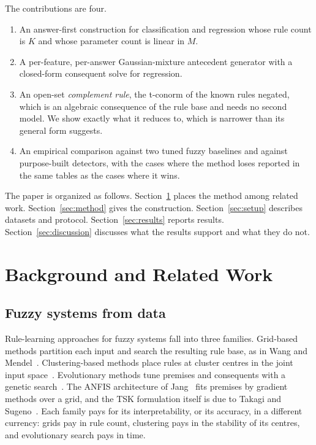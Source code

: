 \documentclass[journal]{IEEEtran}
\begin{document}
The contributions are four.
\begin{enumerate}
\item An answer-first construction for classification and regression whose rule count is $K$ and whose parameter count is linear in $M$.
\item A per-feature, per-answer Gaussian-mixture antecedent generator with a closed-form consequent solve for regression.
\item An open-set \emph{complement rule}, the t-conorm of the known rules negated, which is an algebraic consequence of the rule base and needs no second model. We show exactly what it reduces to, which is narrower than its general form suggests.
\item An empirical comparison against two tuned fuzzy baselines and against purpose-built detectors, with the cases where the method loses reported in the same tables as the cases where it wins.
\end{enumerate}

The paper is organized as follows. Section~\ref{sec:background} places the method among related work. Section~\ref{sec:method} gives the construction. Section~\ref{sec:setup} describes datasets and protocol. Section~\ref{sec:results} reports results. Section~\ref{sec:discussion} discusses what the results support and what they do not.

\section{Background and Related Work}
\label{sec:background}

\subsection{Fuzzy systems from data}
Rule-learning approaches for fuzzy systems fall into three families. Grid-based methods partition each input and search the resulting rule base, as in Wang and Mendel~\cite{wang1992generating}. Clustering-based methods place rules at cluster centres in the joint input space~\cite{chiu1994fuzzy}. Evolutionary methods tune premises and consequents with a genetic search~\cite{cordon2001genetic,herrera2008genetic}. The ANFIS architecture of Jang~\cite{jang1993anfis} fits premises by gradient methods over a grid, and the TSK formulation itself is due to Takagi and Sugeno~\cite{takagi1985fuzzy}. Each family pays for its interpretability, or its accuracy, in a different currency: grids pay in rule count, clustering pays in the stability of its centres, and evolutionary search pays in time.
\end{document}
